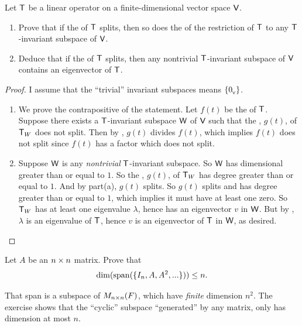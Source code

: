 \begin{exercise} \label{exercise 5.4.16}
Let \(\textsf{T}\) be a linear operator on a finite-dimensional vector space \(\textsf{V}\).
\begin{enumerate}
\item Prove that if the \CPOLY{} of \(\textsf{T}\) splits, then so does the \CPOLY{} of the restriction of \(\textsf{T}\) to any \(\textsf{T}\)-invariant subspace of \(\textsf{V}\).
\item Deduce that if the \CPOLY{} of \(\textsf{T}\) splits, then any nontrivial \(\textsf{T}\)-invariant subspace of \(\textsf{V}\) contains an eigenvector of \(\textsf{T}\).
\end{enumerate}
\end{exercise}

\begin{proof}
I assume that the ``trivial'' invariant subspaces means \(\{ 0_{_{\textsf{V}}} \}\).
\begin{enumerate}
\item We prove the contrapositive of the statement.
Let \(f(t)\) be the \CPOLY{} of \(\textsf{T}\).
Suppose there exists a \(\textsf{T}\)-invariant subspace \(\textsf{W}\) of \(\textsf{V}\) such that the \CPOLY{}, \(g(t)\), of \(\textsf{T}_W\) does not split.
Then by , \(g(t)\) divides \(f(t)\), which implies \(f(t)\) does not split since \(f(t)\) has a factor which does not split.

\item Suppose \(\textsf{W}\) is any \emph{nontrivial} \(\textsf{T}\)-invariant subspace.
So \(\textsf{W}\) has dimensional greater than or equal to \(1\).
So the \CPOLY{}, \(g(t)\), of \(\textsf{T}_W\) has degree greater than or equal to \(1\).
And by part(a), \(g(t)\) splits.
So \(g(t)\) splits and has degree greater than or equal to \(1\), which implies it must have at least one zero.
So \(\textsf{T}_W\) has at least one eigenvalue \(\lambda\), hence has an eigenvector \(v\) in \(\textsf{W}\).
But by , \(\lambda\) is an eigenvalue of \(\textsf{T}\), hence \(v\) is an eigenvector of \(\textsf{T}\) in \(\textsf{W}\), as desired.
\end{enumerate}
\end{proof}

\begin{exercise} \label{exercise 5.4.17}
Let \(A\) be an \(n \times n\) matrix.
Prove that
\[
    \dim(\operatorname{span}(\{ I_n, A, A^2, ... \})) \le n.
\]
\end{exercise}

\begin{note}
That span is a subspace of \(M_{n \times n}(F)\), which have \emph{finite} dimension \(n^2\).
The exercise shows that the ``cyclic'' subspace ``generated'' by any matrix, only has dimension at most \(n\).
\end{note}


